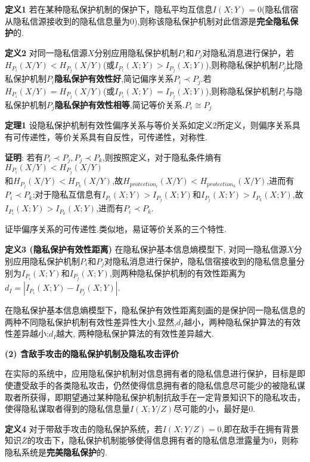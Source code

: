 \textbf{定义1} 若在某种隐私保护机制的保护下，隐私平均互信息$I(X;Y)=0$(隐私信宿从隐私信源接收到的隐私信息量为0),则称该隐私保护机制对此信源是\textbf{完全隐私保护}的.

\textbf{定义2} 对同一隐私信源$X$分别应用隐私保护机制$P_{i}$和$P_{j}$对隐私消息进行保护，若\\$H_{P_{i}}(X/Y)<H_{P_{j}}(X/Y)$(或$I_{P_{i}}(X;Y)>I_{P_{j}}(X;Y)$),则称隐私保护机制$P_{j}$比隐私保护机制$P_{i}$\textbf{隐私保护有效性好},简记偏序关系$P_{i}\prec P_{j}$.若$H_{P_{i}}(X/Y)=H_{P_{j}}(X/Y)$(或$I_{P_{i}}(X;Y)=I_{P_{j}}(X;Y)$),则称隐私保护机制$P_{i}$与隐私保护机制$P_{j}$\textbf{隐私保护有效性相等},简记等价关系.$P_{i}\cong P_{j}$

\textbf{定理1} 设隐私保护机制有效性偏序关系与等价关系如定义2所定义，则偏序关系具有可传递性，等价关系具有自反性，可传递性，对称性.

\textbf{证明}: 若有$P_{i}\prec P_{j},P_{j}\prec P_{k}$,则按照定义，对于隐私条件熵有$H_{P_{i}}(X/Y)< H_{P_{j}}(X/Y)$\\和$H_{P_{j}}(X/Y)< H_{P_{k}}(X/Y)$,故$H_{protection_{i}}(X/Y)< H_{protection_{k}}(X/Y)$,进而有$P_{i}\prec P_{k}$;对于隐私互信息有$I_{P_{i}}(X;Y)>I_{P_{j}}(X;Y)$和$I_{P_{j}}(X;Y)>I_{P_{k}}(X;Y)$,故$I_{P_{i}}(X;Y)>I_{P_{k}}(X;Y)$,进而有$P_{i}\prec P_{k}$.

证毕偏序关系的可传递性.类似地，易证等价关系的三个特性.

\textbf{定义3 (隐私保护有效性距离)} 在隐私保护基本信息熵模型下, 对同一隐私信源$X$分别应用隐私保护机制$P_{i}$和$P_{j}$对隐私消息进行保护，隐私信宿接收到的隐私信息量分别为$I_{P_{i}}(X;Y)$和$I_{P_{j}}(X;Y)$,则两种隐私保护机制的有效性距离为$d_{I}=\left | I_{P_{i}}(X;Y)-I_{P_{j}}(X;Y) \right |$.

在隐私保护基本信息熵模型下，隐私保护有效性距离刻画的是保护同一隐私信息的两种不同隐私保护机制有效性差异性大小.显然,$d_{I}$越小，两种隐私保护算法的有效性差异越小;$d_{I}$越大, 两种隐私保护算法的有效性差异越大.

\textbf{(2) 含敌手攻击的隐私保护机制及隐私攻击评价}

在实际的系统中，应用隐私保护机制对信息拥有者的隐私信息进行保护，目标是即使遭受敌手的各类隐私攻击，仍然使得信息拥有者的隐私信息尽可能少的被隐私谋取者所获得，即期望通过某种隐私保护机制抗敌手在一定背景知识下的隐私攻击，使得隐私谋取者得到的隐私信息量$I(X;Y/Z)$尽可能的小，最好是0.

\textbf{定义4} 对于带敌手攻击的隐私保护系统，若$I(X;Y/Z)=0$,即在敌手在拥有背景知识$Z$的攻击下，隐私保护机制能够使得信息拥有者的隐私信息泄露量为0，则称隐私系统是\textbf{完美隐私保护}的.

